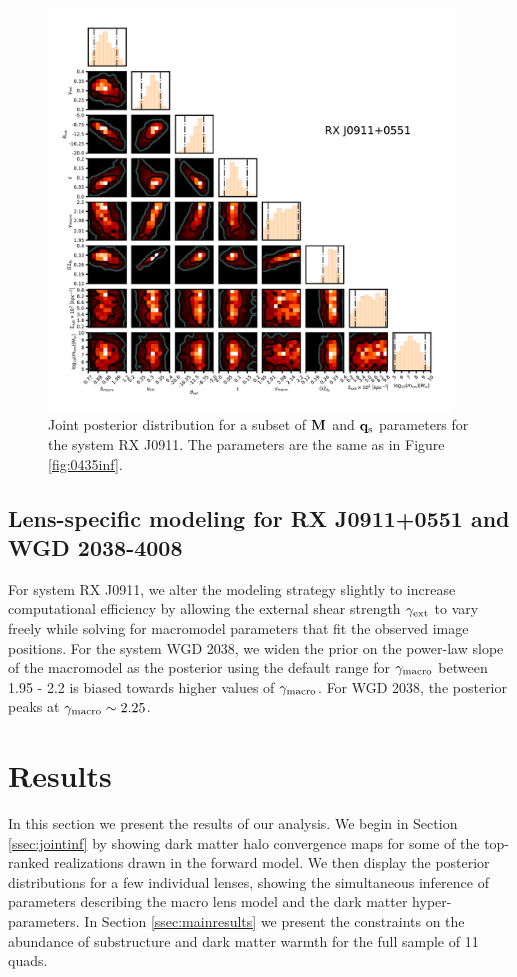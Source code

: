 \begin{figure}
	\includegraphics[clip,trim=1.5cm 1.2cm 1cm
	1cm,width=0.95\textwidth,keepaspectratio]{./figures_wdmchillsout//joint0911.pdf}
	\caption[Joint posterior distribution of model parameters for RXJ 0911]{\label{fig:0911inf} Joint posterior distribution for a subset of ${\bf{M}}$ and ${\bf{q}_{\rm{s}}}$ parameters for the system RX J0911. The parameters are the same as in Figure \ref{fig:0435inf}. }
\end{figure}	

\subsection{Lens-specific modeling for RX J0911+0551 and WGD 2038-4008}
\label{ssec:specificmodeling}
For system RX J0911, we alter the modeling strategy slightly to increase computational efficiency by allowing the external shear strength $\gamma_{\rm{ext}}$ to vary freely while solving for macromodel parameters that fit the observed image positions. 
For the system WGD 2038, we widen the prior on the power-law slope of the macromodel as the posterior using the default range for $\gamma_{\rm{macro}}$ between 1.95 - 2.2 is biased towards higher values of $\gamma_{\rm{macro}}$. For WGD 2038, the posterior peaks at $\gamma_{\rm{macro}} \sim 2.25$.  

\section{Results}
\label{sec:results}
In this section we present the results of our analysis. We begin in Section \ref{ssec:jointinf} by showing dark matter halo convergence maps for some of the top-ranked realizations drawn in the forward model. We then display the posterior distributions for a few individual lenses, showing the simultaneous inference of parameters describing the macro lens model and the dark matter hyper-parameters. In Section \ref{ssec:mainresults} we present the constraints on the abundance of substructure and dark matter warmth for the full sample of 11 quads.

